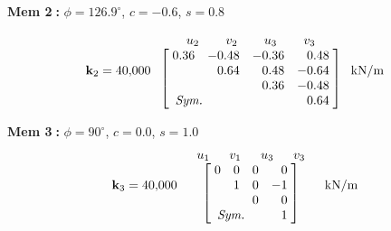 \noindent\textbf{Mem \textcircled{\scriptsize 2}:} $\phi = 126.9^\circ$, $c = -0.6$, $s = 0.8$
\begin{fig}
  
\end{fig}
\begin{equation}
  \kmat_2 = 40{,}000\;
  \begin{array}{c}
    \begin{array}{cccc} \;\;u_2\;\; & \;\;v_2\;\; & \;\;u_3\;\; & \;\;v_3\;\; \end{array}\\
    \left[\begin{array}{@{\;}r@{\quad}r@{\quad}r@{\quad}r@{\;}}
      0.36 & -0.48 & -0.36 & 0.48\\ & 0.64 & 0.48 & -0.64\\ & & 0.36 & -0.48\\ \multicolumn{2}{l}{\textit{Sym.}} & & 0.64
    \end{array}\right]
  \end{array}\;\text{kN/m}
\end{equation}

\noindent\textbf{Mem \textcircled{\scriptsize 3}:} $\phi = 90^\circ$, $c = 0.0$, $s = 1.0$
\begin{equation}
  \kmat_3 = 40{,}000\;
  \begin{array}{c}
    \begin{array}{cccc} \;u_1\; & \;v_1\; & \;u_3\; & \;v_3\; \end{array}\\
    \left[\begin{array}{@{\;}r@{\quad}r@{\quad}r@{\quad}r@{\;}}
      0 & 0 & 0 & 0\\ & 1 & 0 & -1\\ & & 0 & 0\\ \multicolumn{2}{l}{\textit{Sym.}} & & 1
    \end{array}\right]
  \end{array}\;\text{kN/m}
\end{equation}

